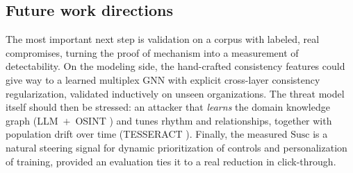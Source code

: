 \subsection{Future work directions}
The most important next step is validation on a corpus with labeled, real compromises, turning the proof of
mechanism into a measurement of detectability. On the modeling side, the hand-crafted consistency features could
give way to a learned multiplex GNN with explicit cross-layer consistency regularization, validated inductively
on unseen organizations. The threat model itself should then be stressed: an attacker that \emph{learns} the
domain knowledge graph (LLM~$+$~OSINT \citep{bethany2024evaluating}) and tunes rhythm and relationships, together
with population drift over time (TESSERACT \citep{pendlebury2019tesseract}). Finally, the measured $\mathrm{Susc}$
is a natural steering signal for dynamic prioritization of controls and personalization of training, provided an
evaluation ties it to a real reduction in click-through.
